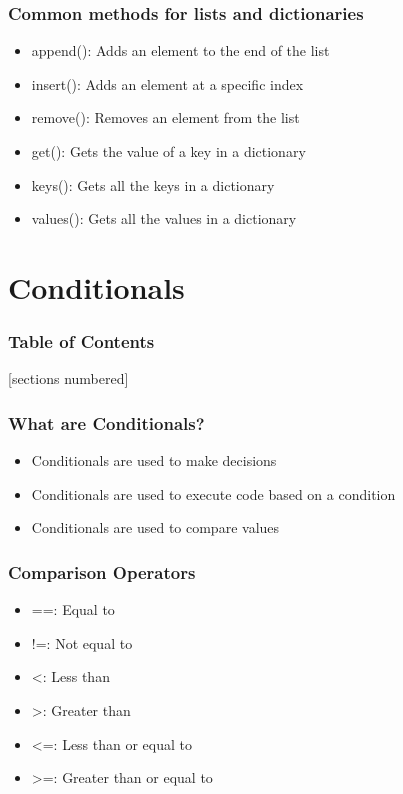 \documentclass[serif, 9pt, aspectratio=32]{beamer}
\begin{document}
\begin{frame}
    \centering
    \frametitle{Common methods for lists and dictionaries}
    \begin{itemize}
        \setlength{\itemsep}{2em}
        \item append(): Adds an element to the end of the list
        \item insert(): Adds an element at a specific index
        \item remove(): Removes an element from the list
        \item get(): Gets the value of a key in a dictionary
        \item keys(): Gets all the keys in a dictionary
        \item values(): Gets all the values in a dictionary
    \end{itemize}
\end{frame}

\section{Conditionals}

\begin{frame}
    \frametitle{Table of Contents}
    [sections numbered]
    \tableofcontents[currentsection]
\end{frame}

\begin{frame}
    \centering
    \frametitle{What are Conditionals?}
    \begin{itemize}
        \setlength{\itemsep}{3em}
        \item Conditionals are used to make decisions
        \item Conditionals are used to execute code based on a condition
        \item Conditionals are used to compare values
    \end{itemize}
\end{frame}

\begin{frame}
    \centering
    \frametitle{Comparison Operators}
    \begin{itemize}
        \setlength{\itemsep}{3em}
        \item ==: Equal to
        \item !=: Not equal to
        \item \textless: Less than
        \item \textgreater: Greater than
        \item \textless=: Less than or equal to
        \item \textgreater=: Greater than or equal to
    \end{itemize}
\end{frame}
\end{document}
